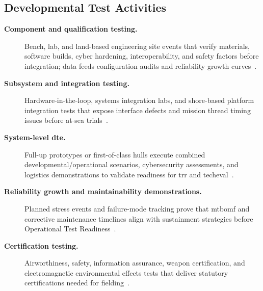 \documentclass[../main.tex]{subfiles}
\begin{document}
\subsection{Developmental Test Activities}
\begin{description}
	\item[\textbf{Component and qualification testing.}] Bench, lab, and land-based engineering site events that verify materials, software builds, cyber hardening, interoperability, and safety factors before integration; data feeds configuration audits and reliability growth curves~\autocite{edo-3-5-5-test-eval-part-i-2025}.
	\item[\textbf{Subsystem and integration testing.}] Hardware-in-the-loop, systems integration labs, and shore-based platform integration tests that expose interface defects and mission thread timing issues before at-sea trials~\autocite{edo-3-5-5-test-eval-part-i-2025}.
	\item[\textbf{System-level \ac{dte}.}] Full-up prototypes or first-of-class hulls execute combined developmental/operational scenarios, cybersecurity assessments, and logistics demonstrations to validate readiness for \ac{trr} and \ac{techeval}~\autocite{DoDI5000-85}.
	\item[\textbf{Reliability growth and maintainability demonstrations.}] Planned stress events and failure-mode tracking prove that \ac{mtbomf} and corrective maintenance timelines align with sustainment strategies before Operational Test Readiness~\autocite{DoDI5000-89}.
	\item[\textbf{Certification testing.}] Airworthiness, safety, information assurance, weapon certification, and electromagnetic environmental effects tests that deliver statutory certifications needed for fielding~\autocite{edo-3-5-5-test-eval-part-i-2025}.
\end{description}
\end{document}
